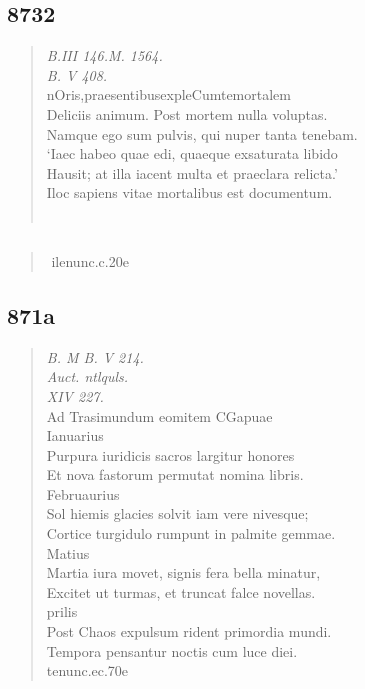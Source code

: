 \documentclass[11pt, a4paper]{report}
\begin{document}
            \subsection*{8732}
      \begin{verse}
      \textit{B.III 146.M. 1564.} \\ \textit{B. V 408.} \\ nOris,praesentibusexpleCumtemortalem \\ Deliciis animum. Post mortem nulla voluptas. \\ Namque ego sum pulvis, qui nuper tanta tenebam. \\ ‘Iaec habeo quae edi, quaeque exsaturata libido \\ Hausit; at illa iacent multa et praeclara relicta.’ \\ Iloc sapiens vitae mortalibus est documentum. \\ 
        ﻿\pagebreak 
      \end{verse}
  
            \subsection*{}
      \begin{verse}
        ﻿\pagebreak 
     \marginpar{[874]} ilenunc.c.20e \\ 
      \end{verse}
  
            \subsection*{871a}
      \begin{verse}
      \textit{B. M B. V 214.} \\ \textit{Auct. ntlquls.} \\ \textit{XIV 227.} \\ Ad Trasimundum eomitem CGapuae \\ Ianuarius \\ Purpura iuridicis sacros largitur honores \\ Et nova fastorum permutat nomina libris. \\ Februaurius \\ Sol hiemis glacies solvit iam vere nivesque; \\ Cortice turgidulo rumpunt in palmite gemmae. \\ Matius \\ Martia iura movet, signis fera bella minatur, \\ Excitet ut turmas, et truncat falce novellas. \\ prilis \\ Post Chaos expulsum rident primordia mundi. \\ Tempora pensantur noctis cum luce diei. \\ 
        ﻿\pagebreak 
     \marginpar{[874]} tenunc.ec.70e \\ 
      \end{verse}
  
\end{document}
